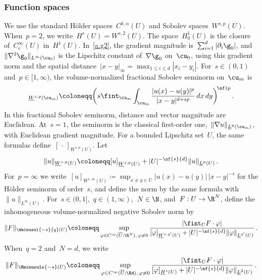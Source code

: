 \documentclass[11pt]{amsart}
\begin{document}
\subsubsection*{Function spaces}
We use the standard H\"older spaces~$C^{k,\alpha}(U)$ and Sobolev spaces~$W^{s,p}(U)$. When~$p=2$, we write~$H^s(U)=W^{s,2}(U)$. The space~$H^1_0(U)$ is the closure of~$C_c^\infty(U)$ in~$H^1(U)$. In~\ref{a.g2}, the gradient magnitude is~$\sum_{i=1}^d|\partial_i\g_0|$, and~$\|\nabla^2\g_0\|_{L^\infty(\cu_0)}$ is the Lipschitz constant of~$\nabla\g_0$ on~$\cu_0$, using this gradient norm and the spatial distance~$|x-y|_\infty=\max_{1\leq i\leq d}|x_i-y_i|$. For~$s\in (0,1)$ and~$p\in [1,\infty)$, the volume-normalized fractional Sobolev seminorm on~$\cu_m$ is
\begin{equation*}
	[  u ]_{\underline{W}^{s,p}(\cu_m)}
	\coloneqq
	\biggl(
	s
	\fint_{\cu_m} \int_{\cu_m}
	\frac{|u(x) - u(y)|^p}{|x-y|^{d+sp}}
	\, dx \, dy
	\biggr)^{\! \nf1p}
	\,.
\end{equation*}
In this fractional Sobolev seminorm, distance and vector magnitude are Euclidean. At~$s=1$, the seminorm is the classical first-order one,~$\|\nabla u\|_{\underline L^p(\cu_m)}$, with Euclidean gradient magnitude. For a bounded Lipschitz set~$U$, the same formulas define~$[\,\cdot\,]_{\underline W^{s,p}(U)}$. Let
\begin{equation*}
	\|u\|_{\underline W^{s,p}(U)}
	\coloneqq
	[u]_{\underline W^{s,p}(U)}+
	|U|^{-\nf{s}{d}}\|u\|_{\underline L^p(U)}\,.
\end{equation*}
For~$p=\infty$ we write~$[u]_{\underline W^{s,\infty}(U)}\coloneqq\sup_{x\neq y\in U}|u(x)-u(y)|\,|x-y|^{-s}$ for the H\"older seminorm of order~$s$, and define the norm by the same formula with~$\|u\|_{L^\infty(U)}$. For~$s\in(0,1]$,~$q\in(1,\infty)$,~$N\in\N$, and~$F:U\to\R^N$, define the inhomogeneous volume-normalized negative Sobolev norm by
\begin{equation*}
	\|F\|_{\Wminusul{-s}{q}(U)}
	\coloneqq
	\sup_{\varphi\in C^\infty(\overline U;\R^N),\,\varphi\neq0}
	\frac{\left|\fint_U F\cdot\varphi\right|}
	{[\varphi]_{\underline W^{s,q'}(U)}+
	|U|^{-\nf{s}{d}}\|\varphi\|_{\underline L^{q'}(U)}}\,.
\end{equation*}
When~$q=2$ and~$N=d$, we write
\begin{equation}
	\|F\|_{\Hminusuls{-s}(U)}
	\coloneqq
	\sup_{\varphi\in C^\infty(\overline U;\Rd),\,\varphi\neq0}
	\frac{\left|\fint_U F\cdot\varphi\right|}
	{[\varphi]_{\underline H^s(U)}+
	|U|^{-\nf{s}{d}}\|\varphi\|_{\underline L^2(U)}}\,.
	\label{e.hatted.negative.norm.convention}
\end{equation}
\end{document}
